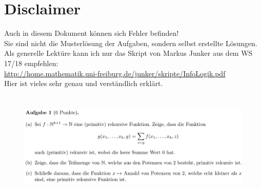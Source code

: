 \documentclass[a4paper]{scrartcl}%
\begin{document}
\section*{Disclaimer}%
\label{sec:disclaimer}
Auch in diesem Dokument können sich Fehler befinden!\\
Sie sind nicht die Musterlösung der Aufgaben, sondern selbst erstellte Lösungen.\\

Als generelle Lektüre kann ich nur das Skript von Markus Junker aus dem WS 17/18 empfehlen:\\
\url{http://home.mathematik.uni-freiburg.de/junker/skripte/InfoLogik.pdf}\\
Hier ist vieles sehr genau und verständlich erklärt.%

\section*{}%
\label{sec:aufgabe_1}

    \begin{figure}[H]
        \includegraphics[scale=0.3]{./A-1.png}
        \label{fig:}
    \end{figure}
\end{document}
